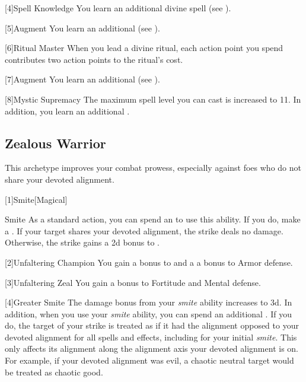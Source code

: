         [4]{Spell Knowledge}
        You learn an additional divine spell (see ).

        [5]{Augment}
        You learn an additional  (see ).

        [6]{Ritual Master}
        When you lead a divine ritual, each action point you spend contributes two action points to the ritual's cost.

        [7]{Augment}
        You learn an additional  (see ).

        [8]{Mystic Supremacy}
        The maximum spell level you can cast is increased to 11.
        In addition, you learn an additional .

    \subsection{Zealous Warrior}
        This archetype improves your combat prowess, especially against foes who do not share your devoted alignment.

        [1]{Smite}[Magical]
        \begin{ability}{Smite}
            As a standard action, you can spend an  to use this ability.
            If you do, make a .
            If your target shares your devoted alignment, the strike deals no damage.
            Otherwise, the strike gains a \plus2d bonus to .
        \end{ability}

        [2]{Unfaltering Champion}
        You gain a  bonus to  and a a  bonus to Armor defense.

        [3]{Unfaltering Zeal}
        You gain a  bonus to Fortitude and Mental defense.

        [4]{Greater Smite} The damage bonus from your \textit{smite} ability increases to \plus3d.
        In addition, when you use your \textit{smite} ability, you can spend an additional .
        If you do, the target of your strike is treated as if it had the alignment opposed to your devoted alignment for all spells and effects, including for your initial \textit{smite}.
        This only affects its alignment along the alignment axis your devoted alignment is on.
        For example, if your devoted alignment was evil, a chaotic neutral target would be treated as chaotic good.

